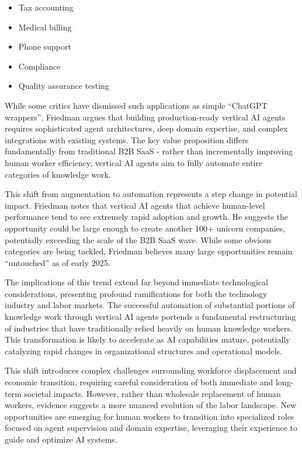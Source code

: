 \documentclass[
]{article}
\providecommand{\tightlist}{%
  \setlength{\itemsep}{0pt}\setlength{\parskip}{0pt}}
\begin{document}
\begin{itemize}
\tightlist
\item
  Tax accounting
\item
  Medical billing
\item
  Phone support
\item
  Compliance
\item
  Quality assurance testing
\end{itemize}

While some critics have dismissed such applications as simple ``ChatGPT
wrappers'', Friedman argues that building production-ready vertical AI
agents requires sophisticated agent architectures, deep domain
expertise, and complex integrations with existing systems. The key value
proposition differs fundamentally from traditional B2B SaaS - rather
than incrementally improving human worker efficiency, vertical AI agents
aim to fully automate entire categories of knowledge work.

This shift from augmentation to automation represents a step change in
potential impact. Friedman notes that vertical AI agents that achieve
human-level performance tend to see extremely rapid adoption and growth.
He suggests the opportunity could be large enough to create another 100+
unicorn companies, potentially exceeding the scale of the B2B SaaS wave.
While some obvious categories are being tackled, Friedman believes many
large opportunities remain ``untouched'' as of early 2025.

The implications of this trend extend far beyond immediate technological
considerations, presenting profound ramifications for both the
technology industry and labor markets. The successful automation of
substantial portions of knowledge work through vertical AI agents
portends a fundamental restructuring of industries that have
traditionally relied heavily on human knowledge workers. This
transformation is likely to accelerate as AI capabilities mature,
potentially catalyzing rapid changes in organizational structures and
operational models.

This shift introduces complex challenges surrounding workforce
displacement and economic transition, requiring careful consideration of
both immediate and long-term societal impacts. However, rather than
wholesale replacement of human workers, evidence suggests a more nuanced
evolution of the labor landscape. New opportunities are emerging for
human workers to transition into specialized roles focused on agent
supervision and domain expertise, leveraging their experience to guide
and optimize AI systems.
\end{document}
